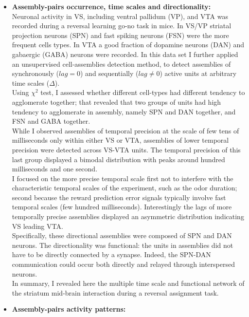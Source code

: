 \begin{itemize}
    \item \textbf{Assembly-pairs occurrence, time scales and directionality:}\\Neuronal activity in VS, including ventral pallidum (VP), and VTA was recorded during a reversal learning go-no task in mice. In VS/VP striatal projection neurons (SPN) and fast spiking neurons (FSN) were the more frequent cells types. In VTA a good fraction of dopamine neurons (DAN) and  gabaergic (GABA) neurons were recorded. In this data set I further applied an unsupervised cell-assemblies detection method, to detect assemblies of synchronously ($lag=0$) and sequentially ($lag\neq0$) active units at arbitrary time scales ($\Delta$).\\Using $\chi^2$ test, I assessed whether different cell-types had different tendency to agglomerate together; that revealed that two groups of units had high tendency to agglomerate in assembly, namely SPN and DAN together, and FSN and GABA together.\\While I observed assemblies of temporal precision at the scale of few tens of milliseconds only within either VS or VTA, assemblies of lower temporal precision were detected across VS-VTA units. The temporal precision of this last group displayed a bimodal distribution with peaks around hundred milliseconds and one second.\\I focused on the more precise temporal scale first not to interfere with the characteristic temporal scales of the experiment, such as the odor duration; second because the reward prediction error signals typically involve fast temporal scales (few hundred milliseconds). Interestingly the lags of more temporally precise assemblies displayed an asymmetric distribution indicating VS leading VTA.\\ Specifically, these directional assemblies were composed of SPN and DAN neurons. The directionality was functional: the units in assemblies did not have to be directly connected by a synapse. Indeed, the SPN-DAN communication could occur both directly and relayed through interspersed neurons.\\In summary, I revealed here the multiple time scale and functional network of the striatum mid-brain interaction during a reversal assignment task.  
    \item \textbf{Assembly-pairs activity patterns:}\\

\end{itemize}
